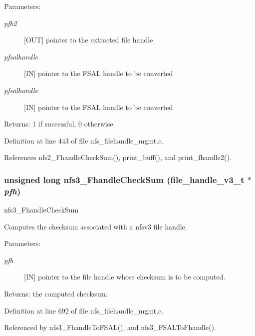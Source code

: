 \begin{Desc}
\item[Parameters:]
\begin{description}
\item[{\em pfh2}][OUT] pointer to the extracted file handle \item[{\em pfsalhandle}][IN] pointer to the FSAL handle to be converted \item[{\em pfsalhandle}][IN] pointer to the FSAL handle to be converted\end{description}
\end{Desc}
\begin{Desc}
\item[Returns:]1 if successful, 0 otherwise \end{Desc}


Definition at line 443 of file nfs\_\-filehandle\_\-mgmt.c.

References nfs2\_\-Fhandle\-Check\-Sum(), print\_\-buff(), and print\_\-fhandle2().
\subsubsection{\setlength{\rightskip}{0pt plus 5cm}unsigned long nfs3\_\-Fhandle\-Check\-Sum (file\_\-handle\_\-v3\_\-t $\ast$ {\em pfh})}\label{nfs__filehandle__mgmt_8c_a16}


nfs3\_\-Fhandle\-Check\-Sum

Computes the checksum associated with a nfsv3 file handle.

\begin{Desc}
\item[Parameters:]
\begin{description}
\item[{\em pfh}][IN] pointer to the file handle whose checksum is to be computed.\end{description}
\end{Desc}
\begin{Desc}
\item[Returns:]the computed checksum. \end{Desc}


Definition at line 692 of file nfs\_\-filehandle\_\-mgmt.c.

Referenced by nfs3\_\-Fhandle\-To\-FSAL(), and nfs3\_\-FSALTo\-Fhandle().
